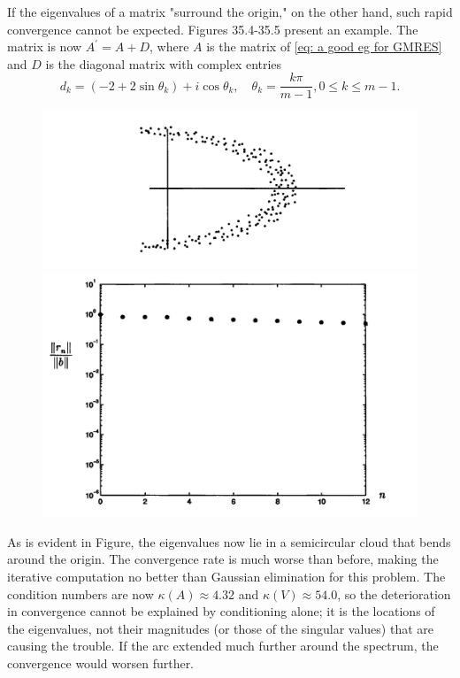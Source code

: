 \begin{example}
\label{eg: A bad eg for GMRES}
If the eigenvalues of a matrix "surround the origin," on the other hand, such rapid convergence cannot be expected. Figures 35.4-35.5 present an example. The matrix is now $A^{\prime}=A+D$, where $A$ is the matrix of \eqref{eq: a good eg for GMRES} and $D$ is the diagonal matrix with complex entries
$$
d_k=\left(-2+2 \sin \theta_k\right)+i \cos \theta_k, \quad \theta_k=\frac{k \pi}{m-1}, 0 \leq k \leq m-1 .
$$

\begin{figure}[H]
\centering
\begin{minipage}{.5\textwidth}
  \centering
  \includegraphics[width=.9\linewidth]{figures/35-4.png}

\end{minipage}%
\begin{minipage}{.5\textwidth}
  \centering
  \includegraphics[width=.8\linewidth]{figures/35-5.png}

\end{minipage}
\end{figure}
As is evident in Figure, the eigenvalues now lie in a semicircular cloud that bends around the origin. The convergence rate is much worse than before, making the iterative computation no better than Gaussian elimination for this problem. The condition numbers are now $\kappa(A) \approx 4.32$ and $\kappa(V) \approx 54.0$, so the deterioration in convergence cannot be explained by conditioning alone; it is the locations of the eigenvalues, not their magnitudes (or those of the singular values) that are causing the trouble. If the arc extended much further around the spectrum, the convergence would worsen further.


\end{example}
